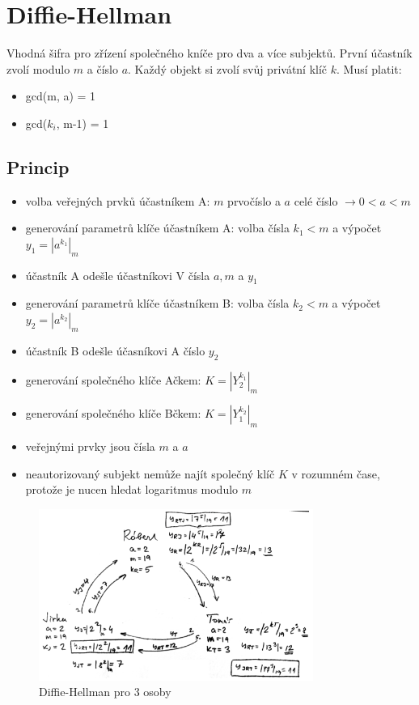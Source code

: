\documentclass{szzclass}
\begin{document}
\section{Diffie-Hellman}
Vhodná šifra pro zřízení společného kníče pro dva a více subjektů. První účastník zvolí modulo $m$ a číslo $a$.
Každý objekt si zvolí svůj privátní klíč $k$.
Musí platit:
\begin{itemize}
    \item gcd(m, a) = 1
    \item gcd($k_i$, m-1) = 1
\end{itemize}
\subsection{Princip}
\begin{itemize}
    \item volba veřejných prvků účastníkem A: $m$ prvočíslo a $a$ celé číslo $\rightarrow 0 < a < m$
    \item generování parametrů klíče účastníkem A: volba čísla $k_1 < m$ a výpočet $y_1 = |a^{k_1}|_m$
    \item účastník A odešle účastníkovi V čísla $a, m$ a $y_1$
    \item generování parametrů klíče účastníkem B: volba čísla $k_2 < m$ a výpočet $y_2 = |a^{k_2}|_m$
    \item účastník B odešle účasníkovi A číslo $y_2$
    \item generování společného klíče Ačkem: $K = |Y^{k_1}_2|_m$
    \item generování společného klíče Bčkem: $K = |Y^{k_2}_1|_m$
    \item veřejnými prvky jsou čísla $m$ a $a$
    \item neautorizovaný subjekt nemůže najít společný klíč $K$ v rozumném čase, protože je nucen hledat logaritmus modulo $m$
\end{itemize}
\begin{figure}[h!]
    \centering
    \includegraphics[width=0.8\textwidth]{topics/bi-spol-06/image/DH.png}
    \caption{Diffie-Hellman pro 3 osoby}
\end{figure}
\end{document}
